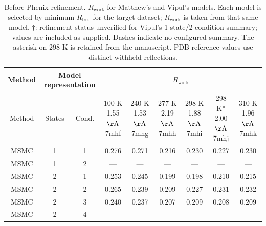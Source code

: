 \begin{table}[htbp]
\centering
\small
\begin{tabular}{|c|c|c|c|c|c|c|c|c|}
\hline
Method & \multicolumn{2}{c|}{Model representation} & \multicolumn{6}{c|}{$R_{\mathrm{work}}$} \\
\hline
Method & States & Cond. & \shortstack{100 K \\ 1.55 $\mathrm{\AA}$ \\ 7mhf} & \shortstack{240 K \\ 1.53 $\mathrm{\AA}$ \\ 7mhg} & \shortstack{277 K \\ 2.19 $\mathrm{\AA}$ \\ 7mhh} & \shortstack{298 K \\ 1.88 $\mathrm{\AA}$ \\ 7mhi} & \shortstack{298 K* \\ 2.00 $\mathrm{\AA}$ \\ 7mhj} & \shortstack{310 K \\ 1.96 $\mathrm{\AA}$ \\ 7mhk} \\
\hline
MSMC & 1 & 1 & 0.276 & 0.271 & 0.216 & 0.230 & 0.227 & 0.230 \\ \hline
MSMC & 1 & 2 & --- & --- & --- & --- & --- & --- \\ \hline
MSMC & 2 & 1 & 0.253 & 0.245 & 0.199 & 0.198 & 0.210 & 0.215 \\ \hline
MSMC & 2 & 2 & 0.265 & 0.239 & 0.209 & 0.227 & 0.231 & 0.232 \\ \hline
MSMC & 2 & 3 & 0.240 & 0.237 & 0.207 & 0.209 & 0.208 & 0.209 \\ \hline
MSMC & 2 & 4 & --- & --- & --- & --- & --- & --- \\ \hline
\end{tabular}
\caption{Before Phenix refinement. $R_{\mathrm{work}}$ for Matthew's and Vipul's models. Each model is selected by minimum $R_{\mathrm{free}}$ for the target dataset; $R_{\mathrm{work}}$ is taken from that same model. $\dagger$: refinement status unverified for Vipul's 1-state/2-condition summary; values are included as supplied. Dashes indicate no configured summary. The asterisk on 298 K is retained from the manuscript. PDB reference values use distinct withheld reflections.}
\label{tab:combined_before_phenix_r_work}
\end{table}
